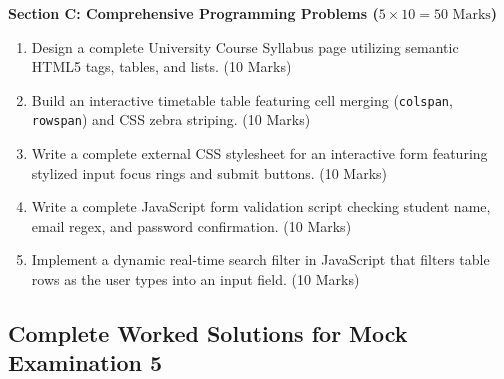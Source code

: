 \begin{mockexam}
\medskip
\noindent\textbf{Section C: Comprehensive Programming Problems ($5 \times 10 = 50\text{ Marks}$)}
\begin{enumerate}[leftmargin=1.5em, start=17]
    \item Design a complete University Course Syllabus page utilizing semantic HTML5 tags, tables, and lists. (10 Marks)
    \item Build an interactive timetable table featuring cell merging (\texttt{colspan}, \texttt{rowspan}) and CSS zebra striping. (10 Marks)
    \item Write a complete external CSS stylesheet for an interactive form featuring stylized input focus rings and submit buttons. (10 Marks)
    \item Write a complete JavaScript form validation script checking student name, email regex, and password confirmation. (10 Marks)
    \item Implement a dynamic real-time search filter in JavaScript that filters table rows as the user types into an input field. (10 Marks)
\end{enumerate}
\end{mockexam}

\subsection{Complete Worked Solutions for Mock Examination 5}

